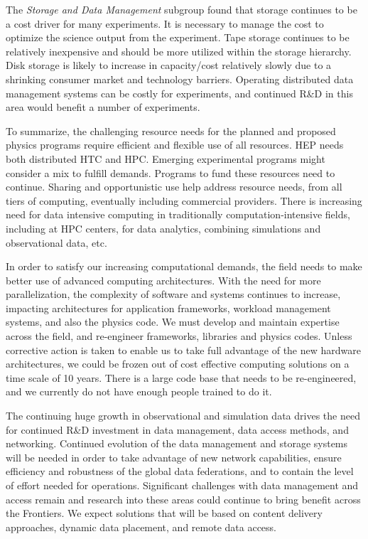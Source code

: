 The {\it Storage and Data Management} subgroup found that storage continues
to be a cost driver for many experiments. It is necessary to manage the
cost to optimize the science output from the experiment. Tape storage
continues to be relatively inexpensive and should be more utilized within
the storage hierarchy. 
Disk storage is likely to increase in capacity/cost relatively slowly due
to a shrinking consumer market and technology barriers.
Operating distributed data management systems can be costly for
experiments, and continued R\&D in this area would benefit a number of 
experiments.

To summarize, the challenging resource needs for the planned and proposed
physics programs require efficient and flexible use of all resources. HEP
needs both distributed HTC and HPC. Emerging experimental programs might
consider a mix to fulfill demands. Programs to fund these resources need to
continue. Sharing and opportunistic use help address resource needs, from
all tiers of computing, eventually including commercial providers. There is
increasing need for data intensive computing in traditionally
computation-intensive fields, including at HPC centers, for data analytics,
combining simulations and observational data, etc.

In order to satisfy our increasing computational demands, the field needs
to make better use of advanced computing architectures. With the need for
more parallelization, the complexity of software and systems continues to
increase, impacting architectures for application frameworks, workload
management systems, and also the physics code. We must develop and maintain
expertise across the field, and re-engineer frameworks, libraries and
physics codes. Unless corrective action is taken to enable us to take full
advantage of the new hardware architectures, we could be frozen out of cost
effective computing solutions on a time scale of 10 years. There is a large
code base that needs to be re-engineered, and we currently do not have
enough people trained to do it.

The continuing huge growth in observational and simulation data drives the
need for continued R\&D investment in data management, data access methods,
and networking. Continued evolution of the data management and storage
systems will be needed in order to take advantage of new network
capabilities, ensure efficiency and robustness of the global data
federations, and to contain the level of effort needed for operations.
Significant challenges with data management and access remain and research
into these areas could continue to bring benefit across the Frontiers.  We
expect solutions that will be based on content delivery approaches, dynamic
data placement, and remote data access.

